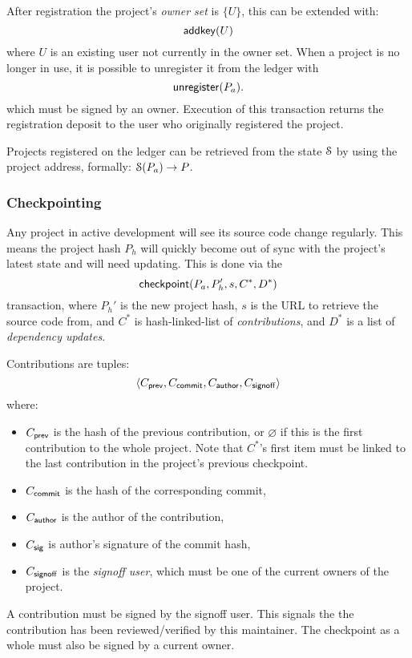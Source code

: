 After registration the project's \emph{owner set} is $\{U\}$, this can
be extended with:
\[
    \mathsf{addkey}\small{\lparen U\rparen}
\]
where $U$ is an existing user not currently in the owner set.
When a project is no longer in use, it is possible to unregister it from the
ledger with
\[
    \mathsf{unregister}\small{\lparen P_a\rparen}.
\]
which must be signed by an owner. Execution of this transaction
returns the registration deposit to the user who originally registered
the project.

Projects registered on the ledger can be retrieved from the state $\mathcal{S}$ by
using the project address, formally: $\mathcal{S}(P_a) \to P$.

\subsubsection{Checkpointing} Any project in active development will see its
source code change regularly. This means the project hash $P_h$ will quickly
become out of sync with the project's latest state and will need updating. This
is done via the
\[
    \mathsf{checkpoint}\small{\lparen P_a, P_h', s, C^*, D^*\rparen}
\]
transaction, where $P_h'$ is the new project hash, $s$ is the URL to
retrieve the source code from, and $C^*$ is hash-linked-list of
\emph{contributions}, and $D^*$ is a list of \emph{dependency updates}.

Contributions are tuples:
\[
   \langle C_{\mathsf{prev}}, C_{\mathsf{commit}}, C_{\mathsf{author}}, C_{\mathsf{signoff}}\rangle
\]
where:
\begin{itemize}
\item $C_{\mathsf{prev}}$ is the hash of the previous contribution, or
  $\varnothing$ if this is the first contribution to the whole
  project. Note that $C^*$'s first item must be linked to the last
  contribution in the project's previous checkpoint.
\item $C_{\mathsf{commit}}$ is the hash of the corresponding commit,
\item $C_{\mathsf{author}}$ is the author of the contribution,
\item $C_{\mathsf{sig}}$ is author's signature of the commit hash,
\item $C_{\mathsf{signoff}}$ is the \emph{signoff user}, which must be
  one of the current owners of the project.
\end{itemize}
A contribution must be signed by the signoff user. This signals the
the contribution has been reviewed/verified by this maintainer. The
checkpoint as a whole must also be signed by a current owner.

